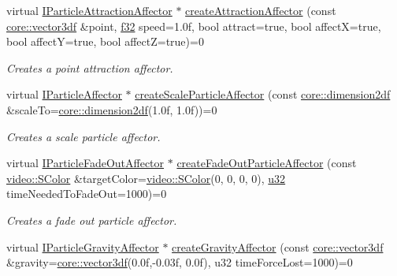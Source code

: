 \begin{DoxyCompactItemize}
virtual \hyperlink{classirr_1_1scene_1_1IParticleAttractionAffector}{I\+Particle\+Attraction\+Affector} $\ast$ \hyperlink{classirr_1_1scene_1_1IParticleSystemSceneNode_a833def146fb8b3d79bbbfbf69a9ed963}{create\+Attraction\+Affector} (const \hyperlink{namespaceirr_1_1core_ae6e2b2a6c552833ebbd5b7463d03586b}{core\+::vector3df} \&point, \hyperlink{namespaceirr_a0277be98d67dc26ff93b1a6a1d086b07}{f32} speed=1.\+0f, bool attract=true, bool affect\+X=true, bool affect\+Y=true, bool affect\+Z=true)=0
\begin{DoxyCompactList}\small\item\em Creates a point attraction affector. \end{DoxyCompactList}\item 
virtual \hyperlink{classirr_1_1scene_1_1IParticleAffector}{I\+Particle\+Affector} $\ast$ \hyperlink{classirr_1_1scene_1_1IParticleSystemSceneNode_a015692bb57e0b6dfff1de96975b3bc74}{create\+Scale\+Particle\+Affector} (const \hyperlink{namespaceirr_1_1core_a54f0e5b7416e6dce5a0f6213f00a580f}{core\+::dimension2df} \&scale\+To=\hyperlink{namespaceirr_1_1core_a54f0e5b7416e6dce5a0f6213f00a580f}{core\+::dimension2df}(1.\+0f, 1.\+0f))=0
\begin{DoxyCompactList}\small\item\em Creates a scale particle affector. \end{DoxyCompactList}\item 
virtual \hyperlink{classirr_1_1scene_1_1IParticleFadeOutAffector}{I\+Particle\+Fade\+Out\+Affector} $\ast$ \hyperlink{classirr_1_1scene_1_1IParticleSystemSceneNode_a4a9c3ecdf6118267f312f9389bb24888}{create\+Fade\+Out\+Particle\+Affector} (const \hyperlink{classirr_1_1video_1_1SColor}{video\+::\+S\+Color} \&target\+Color=\hyperlink{classirr_1_1video_1_1SColor}{video\+::\+S\+Color}(0, 0, 0, 0), \hyperlink{namespaceirr_a0416a53257075833e7002efd0a18e804}{u32} time\+Needed\+To\+Fade\+Out=1000)=0
\begin{DoxyCompactList}\small\item\em Creates a fade out particle affector. \end{DoxyCompactList}\item 
virtual \hyperlink{classirr_1_1scene_1_1IParticleGravityAffector}{I\+Particle\+Gravity\+Affector} $\ast$ \hyperlink{classirr_1_1scene_1_1IParticleSystemSceneNode_af06d3565f9c352bdcdf68bb2e3797c32}{create\+Gravity\+Affector} (const \hyperlink{namespaceirr_1_1core_ae6e2b2a6c552833ebbd5b7463d03586b}{core\+::vector3df} \&gravity=\hyperlink{namespaceirr_1_1core_ae6e2b2a6c552833ebbd5b7463d03586b}{core\+::vector3df}(0.\+0f,-\/0.\+03f, 0.\+0f), u32 time\+Force\+Lost=1000)=0

\end{DoxyCompactItemize}
